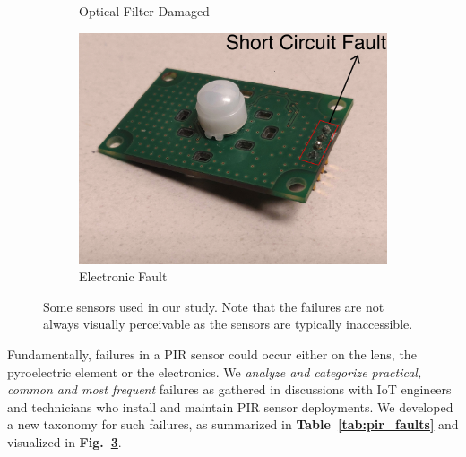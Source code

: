 \begin{figure}
\begin{subfigure}[t]{0.24\textwidth}
		\caption{\footnotesize Optical Filter Damaged}
		\label{fig:failure_photo6}
	\end{subfigure}	
	\hspace{0.1ex}
	\begin{subfigure}[t]{0.24\textwidth}
		\centering
		\includegraphics[width=\textwidth]{figures/platform/failure_photographs/ClassV-ElectronicsFault-annotated-jpg.jpg}
		\caption{Electronic Fault}
		\label{fig:failure_photo7}
	\end{subfigure}	
	\caption{\footnotesize{Some sensors} used in our study. Note that the failures are not always visually perceivable as the sensors are typically inaccessible.}
	\label{fig:pir_sensor_failure_photographs}
\end{figure}




Fundamentally, failures in a PIR sensor could occur either on the lens, the pyroelectric element or the electronics. We \textit{analyze and categorize practical, common and most frequent} failures as gathered in discussions with IoT engineers and technicians who install and maintain PIR sensor deployments. 
We developed a new taxonomy for such failures, as summarized in {\bfseries Table~\ref{tab:pir_faults}} and visualized in {\bfseries Fig.~\ref{fig:pir_sensor_failure_photographs}}. 

